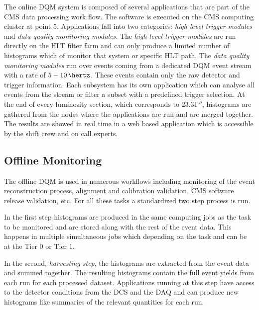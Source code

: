 
The online \gls{DQM} system is composed of several applications that are part of the \gls{CMS} data processing work flow. The software is executed on the \gls{CMS} computing cluster at point 5. Applications fall into two categories: \textit{high level trigger modules} and \textit{data quality monitoring modules}. The \textit{high level trigger modules} are run directly on the \gls{HLT} filter farm and can only produce a limited number of histograms which of monitor that system or specific \gls{HLT} path. The \textit{data quality monitoring modules} run over events coming from a dedicated \gls{DQM} event stream with a rate of $5-10\,\hertz$. These events contain only the raw detector and trigger information. Each subsystem has its own application which can analyse all events from the stream or filter a subset with a predefined trigger selection. At the end of every luminosity section, which corresponds to $23.31\,\second$, histograms are gathered from the nodes where the applications are run and are merged together. The results are showed in real time in a web based application which is accessible by the shift crew and on call experts.

\subsection{Offline Monitoring}
\label{SECTION:TechnicalWork_DataQualityMonitoring_OfflineMonitoring}


The offline \gls{DQM} is used in numerous workflows including monitoring of the event reconstruction process, alignment and calibration validation, \gls{CMS} software release validation, etc. For all these tasks a standardized two step process is run. 

In the first step histograms are produced in the same computing jobs as the task to be monitored and are stored along with the rest of the event data. This happens in multiple simultaneous jobs which depending on the task and can be at the Tier 0 or Tier 1.

In the second, \textit{harvesting step}, the histograms are extracted from the event data and summed together. The resulting histograms contain the full event yields from each run for each processed dataset. Applications running at this step have access to the detector conditions from the \gls{DCS} and the \gls{DAQ} and can produce new histograms like summaries of the relevant quantities for each run.

